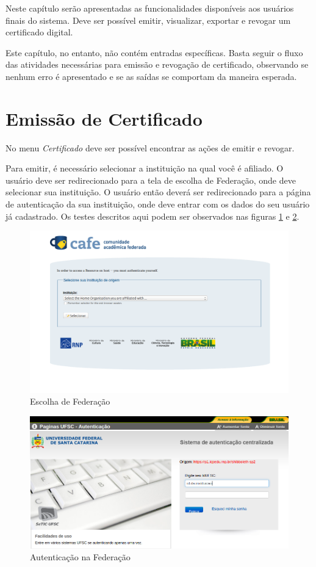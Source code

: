 Neste capítulo serão apresentadas as funcionalidades disponíveis aos usuários finais do sistema.
Deve ser possível emitir, visualizar, exportar e revogar um certificado digital.

Este capítulo, no entanto, não contém entradas específicas. Basta seguir o fluxo das atividades necessárias para emissão e revogação de certificado, observando se nenhum erro é apresentado e se as saídas se comportam da maneira esperada.

\section{Emissão de Certificado}

No menu \textit{Certificado} deve ser possível encontrar as ações de emitir e revogar.

Para emitir, é necessário selecionar a instituição na qual você é afiliado.  O usuário deve ser redirecionado para a tela de escolha de Federação, onde deve selecionar sua instituição. O usuário então deverá ser redirecionado para a página de autenticação da sua instituição, onde deve entrar com os dados do seu usuário já cadastrado. Os testes descritos aqui podem ser observados nas figuras \ref{fig:ufxc} e \ref{fig:ufxc2}.

\begin{figure}[ht]
     \centering
     \includegraphics[scale=0.3]{images/escolher-federacao.png}
     \caption{Escolha de Federação}
     \label{fig:ufxc}
\end{figure}

\begin{figure}[ht]
     \centering
     \includegraphics[scale=0.3]{images/emitir2.png}
     \caption{Autenticação na Federação}
     \label{fig:ufxc2}
\end{figure}

